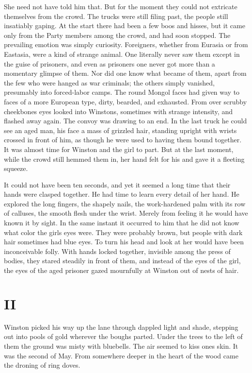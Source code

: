 She need not have told him that. But for the moment they could not
extricate themselves from the crowd. The trucks were still filing past,
the people still insatiably gaping. At the start there had been a few
boos and hisses, but it came only from the Party members among the
crowd, and had soon stopped. The prevailing emotion was simply
curiosity. Foreigners, whether from Eurasia or from Eastasia, were a
kind of strange animal. One literally never saw them except in the guise
of prisoners, and even as prisoners one never got more than a momentary
glimpse of them. Nor did one know what became of them, apart from the
few who were hanged as war criminals; the others simply vanished,
presumably into forced-labor camps. The round Mongol faces had given way
to faces of a more European type, dirty, bearded, and exhausted. From
over scrubby cheekbones eyes looked into Winston\textquotesingle s,
sometimes with strange intensity, and flashed away again. The convoy was
drawing to an end. In the last truck he could see an aged man, his face
a mass of grizzled hair, standing upright with wrists crossed in front
of him, as though he were used to having them bound together. It was
almost time for Winston and the girl to part. But at the last moment,
while the crowd still hemmed them in, her hand felt for his and gave it
a fleeting squeeze.

It could not have been ten seconds, and yet it seemed a long time that
their hands were clasped together. He had time to learn every detail of
her hand. He explored the long fingers, the shapely nails, the
work-hardened palm with its row of calluses, the smooth flesh under the
wrist. Merely from feeling it he would have known it by sight. In the
same instant it occurred to him that he did not know what color the
girl\textquotesingle s eyes were. They were probably brown, but people
with dark hair sometimes had blue eyes. To turn his head and look at her
would have been inconceivable folly. With hands locked together,
invisible among the press of bodies, they stared steadily in front of
them, and instead of the eyes of the girl, the eyes of the aged prisoner
gazed mournfully at Winston out of nests of hair.


\section{II}\label{ii-1}

Winston picked his way up the lane through dappled light and shade,
stepping out into pools of gold wherever the boughs parted. Under the
trees to the left of them the ground was misty with bluebells. The air
seemed to kiss one\textquotesingle s skin. It was the second of May.
From somewhere deeper in the heart of the wood came the droning of ring
doves.

